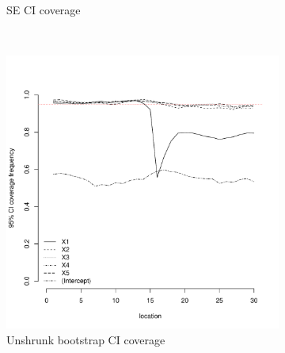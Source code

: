 \documentclass[authoryear, review, 11pt]{elsarticle}
\begin{document}
\begin{figure}
\begin{subfigure}[b]{0.45\textwidth}
		\caption{SE CI coverage}
	\end{subfigure}%
	\\%
	\begin{subfigure}[b]{0.45\textwidth}
	\centering
		\includegraphics[width=\textwidth]{../../figures/simulation/15.15.profile_unshrunk_bootstrap_coverage.pdf}
		\caption{Unshrunk bootstrap CI coverage}
	\end{subfigure}%
	~ %
	\begin{subfigure}[b]{0.45\textwidth}
	\centering

\end{subfigure}
\end{figure}
\end{document}
